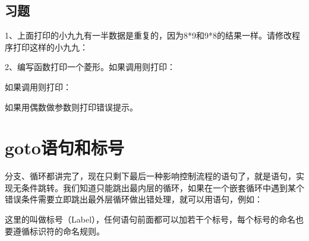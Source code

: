 \subsection*{习题}
%


1、上面打印的小九九有一半数据是重复的，因为8*\BookSplit{}9和9*\BookSplit{}8的结果一样。请修改程序打印这样的小九九：




2、编写函数打印一个菱形。如果调用则打印：




如果调用则打印：




如果用偶数做参数则打印错误提示。




\section{goto语句和标号}
%
分支、循环都讲完了，现在只剩下最后一种影响控制流程的语句了，就是语句，实现无条件跳转。我们知道只能跳出最内层的循环，如果在一个嵌套循环中遇到某个错误条件需要立即跳出最外层循环做出错处理，就可以用语句，例如：




这里的叫做标号（Label），任何语句前面都可以加若干个标号，每个标号的命名也要遵循标识符的命名规则。



